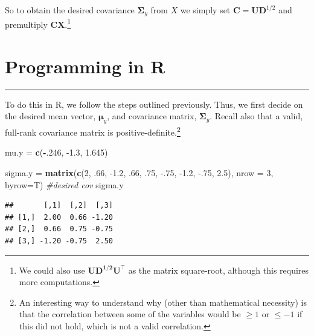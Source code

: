 \documentclass[
]{article}
\newenvironment{Shaded}{\begin{snugshade}}{\end{snugshade}}
\newcommand{\CommentTok}[1]{\textcolor[rgb]{0.56,0.35,0.01}{\textit{#1}}}
\newcommand{\DataTypeTok}[1]{\textcolor[rgb]{0.13,0.29,0.53}{#1}}
\newcommand{\DecValTok}[1]{\textcolor[rgb]{0.00,0.00,0.81}{#1}}
\newcommand{\FloatTok}[1]{\textcolor[rgb]{0.00,0.00,0.81}{#1}}
\newcommand{\KeywordTok}[1]{\textcolor[rgb]{0.13,0.29,0.53}{\textbf{#1}}}
\newcommand{\NormalTok}[1]{#1}
\newcommand{\OperatorTok}[1]{\textcolor[rgb]{0.81,0.36,0.00}{\textbf{#1}}}
\newcommand{\StringTok}[1]{\textcolor[rgb]{0.31,0.60,0.02}{#1}}
\begin{document}
So to obtain the desired covariance \(\boldsymbol{\Sigma}_y\) from \(X\)
we simply set \(\boldsymbol{C} = \boldsymbol{UD}^{1/2}\) and premultiply
\(\boldsymbol{CX}\).\footnote{We could also use
  \(\boldsymbol{UD^{1/2}U^\top}\) as the matrix square-root, although
  this requires more computations.}

\hfill\break

\hypertarget{programming-in-r}{%
\section{Programming in R}\label{programming-in-r}}

\begin{center}\rule{0.5\linewidth}{0.5pt}\end{center}

To do this in R, we follow the steps outlined previously. Thus, we first
decide on the desired mean vector, \(\boldsymbol{\mu}_y\), and
covariance matrix, \(\boldsymbol{\Sigma}_y\). Recall also that a valid,
full-rank covariance matrix is positive-definite.\footnote{An
  interesting way to understand why (other than mathematical necessity)
  is that the correlation between some of the variables would be
  \(\geq 1\) or \(\leq -1\) if this did not hold, which is not a valid
  correlation.}

\begin{Shaded}
\begin{Highlighting}[]
\NormalTok{mu.y =}\StringTok{ }\KeywordTok{c}\NormalTok{(}\OperatorTok{{-}}\NormalTok{.}\DecValTok{246}\NormalTok{, }\FloatTok{{-}1.3}\NormalTok{, }\FloatTok{1.645}\NormalTok{)}

\NormalTok{sigma.y =}\StringTok{ }\KeywordTok{matrix}\NormalTok{(}\KeywordTok{c}\NormalTok{(}\DecValTok{2}\NormalTok{,    }\FloatTok{.66}\NormalTok{, }\FloatTok{{-}1.2}\NormalTok{,}
                   \FloatTok{.66}\NormalTok{,  }\FloatTok{.75}\NormalTok{, }\FloatTok{{-}.75}\NormalTok{,}
                  \FloatTok{{-}1.2}\NormalTok{, }\FloatTok{{-}.75}\NormalTok{,  }\FloatTok{2.5}\NormalTok{),}
                 \DataTypeTok{nrow =} \DecValTok{3}\NormalTok{, }\DataTypeTok{byrow=}\NormalTok{T)}
\CommentTok{\#desired cov}
\NormalTok{sigma.y}
\end{Highlighting}
\end{Shaded}

\begin{verbatim}
##       [,1]  [,2]  [,3]
## [1,]  2.00  0.66 -1.20
## [2,]  0.66  0.75 -0.75
## [3,] -1.20 -0.75  2.50
\end{verbatim}
\end{document}
